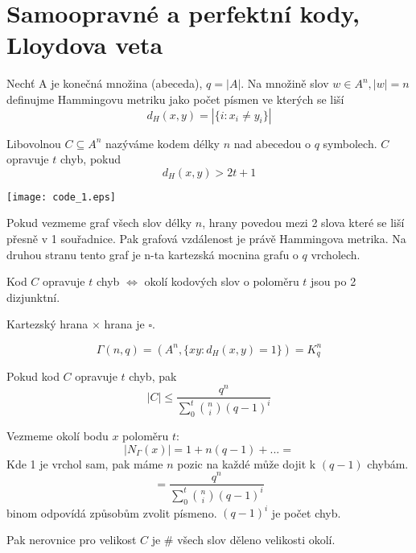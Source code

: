\section{\texorpdfstring{Samoopravné a perfektní kody, Lloydova veta}{Samoopravné a perfektní kody, Lloydova veta}}
\vspace{5mm}
\large

\begin{definition}
	Nechť A je konečná množina (abeceda), $q = |A|$. Na množině slov $w \in A^n, |w| = n$ definujme Hammingovu metriku jako počet písmen ve kterých se liší
	\[ d_H(x, y) = |\{i : x_i \neq y_i \}| \]

	Libovolnou $C \subseteq A^n$ nazýváme kodem délky $n$ nad abecedou o $q$ symbolech. $C$ opravuje $t$ chyb, pokud
	\[ d_H(x, y) > 2t + 1 \]

	\texttt{[image: code\_1.eps]}
\end{definition}

\begin{observation}
	Pokud vezmeme graf všech slov délky $n$, hrany povedou mezi 2 slova které se liší přesně v 1 souřadnice. Pak grafová vzdálenost je právě Hammingova metrika. Na druhou stranu tento graf je n-ta kartezská mocnina grafu o $q$ vrcholech.

	Kod $C$ opravuje $t$ chyb $\iff$ okolí kodových slov o poloměru $t$ jsou po 2 dizjunktní.
\end{observation}

\begin{observation}
	Kartezský hrana $\times$ hrana je $\square$.
\end{observation}

\begin{definition}
	\[ \Gamma(n,q) = (A^n, \{xy: d_H(x, y) = 1 \}) = K_q^n \]
\end{definition}

\begin{note}
	Pokud kod $C$ opravuje $t$ chyb, pak
	\[ |C| \leq \frac{q^n}{\sum_0^t \binom{n}{i} (q - 1)^i} \]

	Vezmeme okolí bodu $x$ poloměru $t$:
	\[ |N_{\Gamma}(x)| = 1 + n(q - 1) + ... = \]
	Kde 1 je vrchol sam, pak máme $n$ pozic na každé může dojit k $(q - 1)$ chybám.
	\[ = \frac{q^n}{\sum_0^t \binom{n}{i} (q - 1)^i} \]
	binom odpovídá způsobům zvolit písmeno. $(q - 1)^i$ je počet chyb.

	Pak nerovnice pro velikost $C$ je \# všech slov děleno velikosti okolí.

\end{note}

